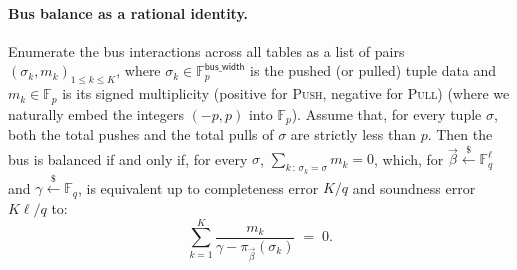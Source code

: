 \documentclass{article}
\theoremstyle{definition}
\newcommand{\Fp}{\mathbb F_p}
\newcommand{\Fq}{\mathbb F_q}
\begin{document}
\paragraph{Bus balance as a rational identity.} Enumerate the bus interactions across all tables as a list of pairs $(\sigma_k, m_k)_{1 \leq k \leq K}$, where $\sigma_k \in \Fp^{\textsf{bus\_width}}$ is the pushed (or pulled) tuple data and $m_k \in \Fp$ is its signed multiplicity (positive for \textsc{Push}, negative for \textsc{Pull}) (where we naturally embed the integers $(-p, p)$ into $\Fp$). Assume that, for every tuple $\sigma$, both the total pushes and the total pulls of $\sigma$ are strictly less than $p$. Then the bus is balanced if and only if, for every $\sigma$, $\sum_{k \,:\, \sigma_k = \sigma} m_k = 0$, which, for $\vec\beta \overset{\$}{\leftarrow} \Fq^\ell$ and $\gamma \overset{\$}{\leftarrow} \Fq$, is equivalent up to completeness error $K / q$ and soundness error $K \ell / q$ to:
\begin{equation} \label{eq:logup-sum}
\sum_{k=1}^{K} \frac{m_k}{\gamma - \pi_{\vec\beta}(\sigma_k)} \;=\; 0.
\end{equation}
\end{document}

